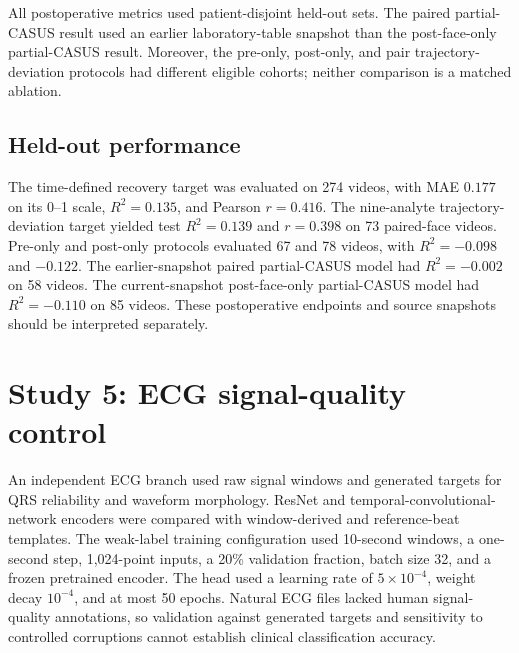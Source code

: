 \documentclass[10pt,a4paper]{article}
\begin{document}
\begin{center}
\begin{minipage}{\linewidth}
\centering

\label{fig:postoparch}
\end{minipage}
\end{center}

All postoperative metrics used patient-disjoint held-out sets. The paired partial-CASUS result used an earlier laboratory-table snapshot than the post-face-only partial-CASUS result. Moreover, the pre-only, post-only, and pair trajectory-deviation protocols had different eligible cohorts; neither comparison is a matched ablation.

\subsection{Held-out performance}

The time-defined recovery target was evaluated on 274 videos, with MAE $0.177$ on its 0--1 scale, $R^2=0.135$, and Pearson $r=0.416$. The nine-analyte trajectory-deviation target yielded test $R^2=0.139$ and $r=0.398$ on 73 paired-face videos. Pre-only and post-only protocols evaluated 67 and 78 videos, with $R^2=-0.098$ and $-0.122$. The earlier-snapshot paired partial-CASUS model had $R^2=-0.002$ on 58 videos. The current-snapshot post-face-only partial-CASUS model had $R^2=-0.110$ on 85 videos. These postoperative endpoints and source snapshots should be interpreted separately.

\section{Study 5: ECG signal-quality control}

An independent ECG branch used raw signal windows and generated targets for QRS reliability and waveform morphology. ResNet and temporal-convolutional-network encoders were compared with window-derived and reference-beat templates. The weak-label training configuration used 10-second windows, a one-second step, 1,024-point inputs, a 20\% validation fraction, batch size 32, and a frozen pretrained encoder. The head used a learning rate of $5\times10^{-4}$, weight decay $10^{-4}$, and at most 50 epochs. Natural ECG files lacked human signal-quality annotations, so validation against generated targets and sensitivity to controlled corruptions cannot establish clinical classification accuracy.
\end{document}
